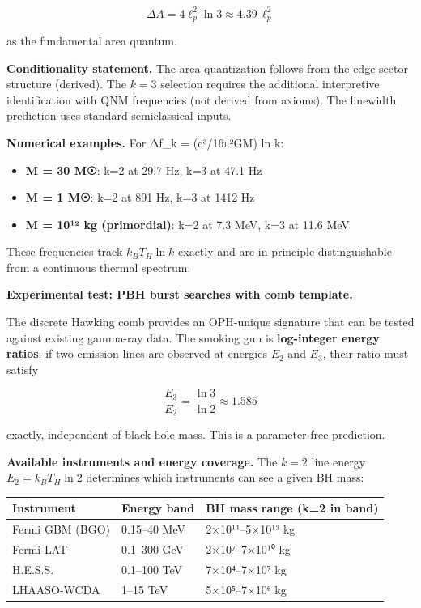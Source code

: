 \[
\Delta A = 4\ell_p^2 \ln 3 \approx 4.39 \, \ell_p^2
\]

as the fundamental area quantum.

\textbf{Conditionality statement.} The area quantization follows from the edge-sector structure (derived). The \(k = 3\) selection requires the additional interpretive identification with QNM frequencies (not derived from axioms). The linewidth prediction uses standard semiclassical inputs.

\textbf{Numerical examples.} For Δf\_k = (c³/16π²GM) ln k:

\begin{itemize}
\tightlist
\item
  \textbf{M = 30 M☉}: k=2 at 29.7 Hz, k=3 at 47.1 Hz
\item
  \textbf{M = 1 M☉}: k=2 at 891 Hz, k=3 at 1412 Hz
\item
  \textbf{M = 10¹² kg (primordial)}: k=2 at 7.3 MeV, k=3 at 11.6 MeV
\end{itemize}

These frequencies track \(k_B T_H \ln k\) exactly and are in principle distinguishable from a continuous thermal spectrum.

\textbf{Experimental test: PBH burst searches with comb template.}

The discrete Hawking comb provides an OPH-unique signature that can be tested against existing gamma-ray data. The smoking gun is \textbf{log-integer energy ratios}: if two emission lines are observed at energies \(E_2\) and \(E_3\), their ratio must satisfy

\[
\frac{E_3}{E_2} = \frac{\ln 3}{\ln 2} \approx 1.585
\]

exactly, independent of black hole mass. This is a parameter-free prediction.

\textbf{Available instruments and energy coverage.} The \(k = 2\) line energy \(E_2 = k_B T_H \ln 2\) determines which instruments can see a given BH mass:

{\def\LTcaptype{none} %
\begin{longtable}[]{@{}lll@{}}
\toprule\noalign{}
Instrument & Energy band & BH mass range (k=2 in band) \\
\midrule\noalign{}
\endhead
\bottomrule\noalign{}
\endlastfoot
Fermi GBM (BGO) & 0.15--40 MeV & 2×10¹¹--5×10¹³ kg \\
Fermi LAT & 0.1--300 GeV & 2×10⁷--7×10¹⁰ kg \\
H.E.S.S. & 0.1--100 TeV & 7×10⁴--7×10⁷ kg \\
LHAASO-WCDA & 1--15 TeV & 5×10⁵--7×10⁶ kg \\
\end{longtable}
}

